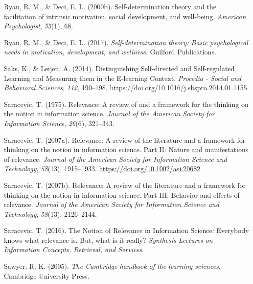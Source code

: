 \documentclass[letterpaper, nobind]{templates/ociamthesis}
\newlength{\cslhangindent}
\newenvironment{CSLReferences}[2] %
 {%
  \setlength{\parindent}{0pt}
  \ifodd #1
  \let\oldpar\par
  \def\par{\hangindent=\cslhangindent\oldpar}
  \fi
  \setlength{\parskip}{1mm}
  \setlength{\baselineskip}{6mm}
 }%
 {}
\begin{document}
\begin{CSLReferences}{1}{0}
\leavevmode{}%
Ryan, R. M., \& Deci, E. L. (2000b). Self-determination theory and the facilitation of intrinsic motivation, social development, and well-being. \emph{American Psychologist}, \emph{55}(1), 68.

\leavevmode{}%
Ryan, R. M., \& Deci, E. L. (2017). \emph{Self-determination theory: Basic psychological needs in motivation, development, and wellness}. Guilford Publications.

\leavevmode{}%
Saks, K., \& Leijen, Ä. (2014). Distinguishing {Self}-directed and {Self}-regulated {Learning} and {Measuring} them in the {E}-learning {Context}. \emph{Procedia - Social and Behavioral Sciences}, \emph{112}, 190--198. \url{https://doi.org/10.1016/j.sbspro.2014.01.1155}

\leavevmode{}%
Saracevic, T. (1975). Relevance: A review of and a framework for the thinking on the notion in information science. \emph{Journal of the American Society for Information Science}, \emph{26}(6), 321--343.

\leavevmode{}%
Saracevic, T. (2007a). Relevance: A review of the literature and a framework for thinking on the notion in information science. {Part II}: Nature and manifestations of relevance. \emph{Journal of the American Society for Information Science and Technology}, \emph{58}(13), 1915--1933. \url{https://doi.org/10.1002/asi.20682}

\leavevmode{}%
Saracevic, T. (2007b). Relevance: A review of the literature and a framework for thinking on the notion in information science. {Part III}: Behavior and effects of relevance. \emph{Journal of the American Society for Information Science and Technology}, \emph{58}(13), 2126--2144.

\leavevmode{}%
Saracevic, T. (2016). The {Notion} of {Relevance} in {Information Science}: {Everybody} knows what relevance is. {But}, what is it really? \emph{Synthesis Lectures on Information Concepts, Retrieval, and Services}.

\leavevmode{}%
Sawyer, R. K. (2005). \emph{The {Cambridge} handbook of the learning sciences}. {Cambridge University Press}.


\end{CSLReferences}
\end{document}
